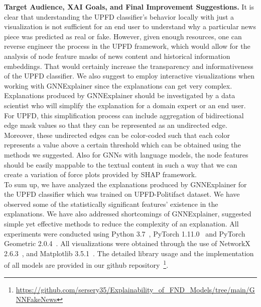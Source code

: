 \textbf{Target Audience, XAI Goals, and Final Improvement Suggestions.} It is clear that understanding the UPFD classifier's behavior locally with just a visualization is not sufficient for an end user to understand why a particular news piece was predicted as real or fake. However, given enough resources, one can reverse engineer the process in the UPFD framework, which would allow for the analysis of node feature masks of news content and historical information embeddings. That would certainly increase the transparency and informativeness of the UPFD classifier. We also suggest to employ interactive visualizations when working with GNNExplainer since the explanations can get very complex. Explanations produced by GNNExplainer should be investigated by a data scientist who will simplify the explanation for a domain expert or an end user. For UPFD, this simplification process can include aggregation of bidirectional edge mask values so that they can be represented as an undirected edge. Moreover, these undirected edges can be color-coded such that each color represents a value above a certain threshold which can be obtained using the methods we suggested. Also for GNNs with language models, the node features should be easily mappable to the textual content in such a way that we can create a variation of force plots provided by SHAP framework.\\
To sum up, we have analyzed the explanations produced by GNNExplainer for the UPFD classifier which was trained on UPFD-Politifact dataset. We have observed some of the statistically significant features' existence in the explanations. We have also addressed shortcomings of GNNExplainer, suggested simple yet effective methods to reduce the complexity of an explanation. All experiments were conducted using Python 3.7~\parencite{Python_Rossum}, PyTorch 1.11.0~\parencite{PyTorch_Paszke} and PyTorch Geometric 2.0.4~\parencite{PyTorchGeometric_Fey}. All visualizations were obtained through the use of NetworkX 2.6.3~\parencite{NetworkX_Hagberg}, and Matplotlib 3.5.1~\parencite{Matplotlib_Hunter}. The detailed library usage and the implementation of all models are provided in our github repository~\footnote{\url{https://github.com/sersery35/Explainability_of_FND_Models/tree/main/GNNFakeNews}}.